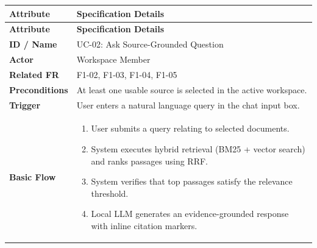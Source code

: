 \setlength{\tabcolsep}{5pt}

\renewcommand{\arraystretch}{1.1}

\begin{longtable}{>{\raggedright\arraybackslash}p{}>{\raggedright\arraybackslash}p{}}

\hline

\rowcolor{tablehead}

\textbf{Attribute} & \textbf{Specification Details} \\ \hline

\endfirsthead

\hline

\rowcolor{tablehead}

\textbf{Attribute} & \textbf{Specification Details} \\ \hline

\endhead

\endfoot

\endlastfoot

\textbf{ID / Name} & UC-02: Ask Source-Grounded Question \\ \hline

\textbf{Actor} & Workspace Member \\ \hline

\textbf{Related FR} & F1-02, F1-03, F1-04, F1-05 \\ \hline

\textbf{Preconditions} & At least one usable source is selected in the active workspace. \\ \hline

\textbf{Trigger} & User enters a natural language query in the chat input box. \\ \hline

\textbf{Basic Flow} & \begin{enumerate}[nosep,leftmargin=*,label=\arabic*.]

    \item User submits a query relating to selected documents.

    \item System executes hybrid retrieval (BM25 + vector search) and ranks passages using RRF.

    \item System verifies that top passages satisfy the relevance threshold.

    \item Local LLM generates an evidence-grounded response with inline citation markers.


\end{enumerate}
\end{longtable}
